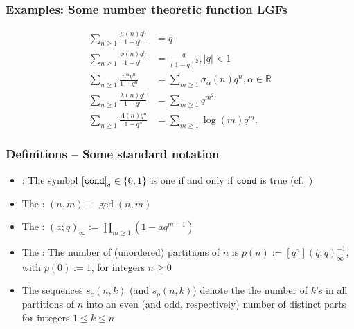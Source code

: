 \begin{frame}
\frametitle{Examples: Some number theoretic function LGFs}

\begin{subequations}
\begin{align} 
\label{eqn_WellKnown_LamberSeries_Examples} 
\sum_{n \geq 1} \frac{\mu(n) q^n}{1-q^n} & = q \\ 
\sum_{n \geq 1} \frac{\phi(n) q^n}{1-q^n} & = \frac{q}{(1-q)^2}, |q| < 1 \\ 
\sum_{n \geq 1} \frac{n^{\alpha} q^n}{1-q^n} & =  
	\sum_{m \geq 1} \sigma_{\alpha}(n) q^n, \alpha \in \mathbb{R} \\ 
\sum_{n \geq 1} \frac{\lambda(n) q^n}{1-q^n} & = \sum_{m \geq 1} q^{m^2} \\ 
\sum_{n \geq 1} \frac{\Lambda(n) q^n}{1-q^n} & = \sum_{m \geq 1} \log(m) q^m. 
\end{align}
\end{subequations}

\end{frame}

\begin{frame}
\frametitle{Definitions -- Some standard notation}
\begin{itemize} 

\item {}: The symbol $\left[\mathtt{cond}\right]_{\delta} \in \{0, 1\}$ 
      is one if and only if $\mathtt{cond}$ is true (cf.~\cite{KNUTHNOTATION}) 
\pause\item The : $(n, m) \equiv \operatorname{gcd}(n, m)$
\pause\item The : 
      $(a; q)_{\infty} := \prod_{m \geq 1} (1-aq^{m-1})$ 
\pause\item The : The number of (unordered) partitions of $n$ is 
      $p(n) := [q^n] (q; q)_{\infty}^{-1}$, with $p(0) := 1$, for integers $n \geq 0$ 
\pause\item The sequences $s_e(n, k)$ (and $s_o(n, k)$)
      denote the the number of $k$’s in all partitions of $n$
      into an even (and odd, respectively) number of distinct parts for integers $1 \leq k \leq n$

\end{itemize}

\end{frame}

